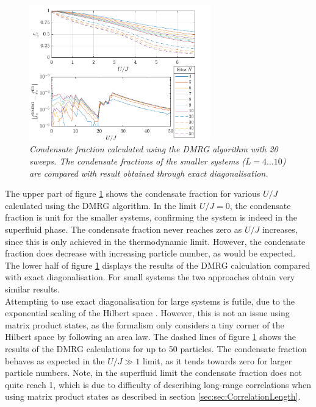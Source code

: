 \begin{figure}[h!]
    \centering
    \includegraphics[width=0.7\textwidth]{Figures/CondensateFractionCompare.pdf}
 \caption{\textit{Condensate fraction calculated using the DMRG algorithm with 20 sweeps. The condensate fractions of the smaller systems ($L = 4 \ldots 10$) are compared with result obtained through exact diagonalisation.}}
 \label{fig:CondensateFraction}
\end{figure}
The upper part of figure \ref{fig:CondensateFraction} shows the condensate fraction for various $U/J$ calculated using the DMRG algorithm. In the limit $U/J = 0$, the condensate fraction is unit for the smaller systems, confirming the system is indeed in the superfluid phase. The condensate fraction never reaches zero as $U/J$ increases, since this is only achieved in the thermodynamic limit. However, the condensate fraction does decrease with increasing particle number, as would be expected. The lower half of figure \ref{fig:CondensateFraction}  displays the results of the DMRG calculation compared with exact diagonalisation. For small systems the two approaches obtain very similar results.\\
Attempting to use exact diagonalisation for large systems is futile, due to the exponential scaling of the Hilbert space \cite{Vidal2003}. However, this is not an issue using matrix product states, as the formalism only considers a tiny corner of the Hilbert space by following an area law. 
The dashed lines of figure \ref{fig:CondensateFraction} shows the results of the DMRG calculations for up to 50 particles. The condensate fraction behaves as expected in the $U/J \gg 1$ limit, as it tends towards zero for larger particle numbers. Note, in the superfluid limit the condensate fraction does not quite reach 1, which is due to difficulty of describing long-range correlations when using matrix product states as described in section \ref{sec:sec:CorrelationLength}.
